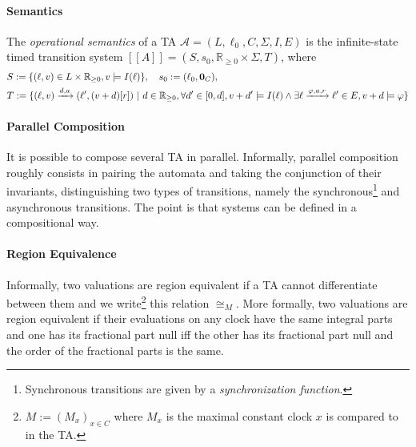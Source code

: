 \documentclass[11pt]{article}
\theoremstyle{definition}
\theoremstyle{remark}
\theoremstyle{definition}
\begin{document}
\paragraph{Semantics}\label{par:semantics}
The \emph{operational semantics} of a TA $\mathcal{A} = (L, \ell_0, C, \Sigma, I, E)$ is the infinite-state timed transition system $[\![A]\!] = (S, s_0, \mathbb{R}_{\geq 0} \times \Sigma, T)$, where
\begin{align*}
	&S := \{(\ell, v) \in L \times \mathbb{R}_{\geq 0}, v \models I(\ell)\}, \quad s_0 := (\ell_0, \text{\bf 0}_C),\\
	&T := \{(\ell, v) \xrightarrow{d, a} (\ell', (v+d)[r]) \ | \ d \in \mathbb{R}_{\geq 0}, \forall d' \in [0, d], v + d' \models I(\ell) \land \exists \ell \xrightarrow{\varphi, a, r} \ell' \in E, v + d \models \varphi \}
\end{align*}


\paragraph{Parallel Composition}\label{par:ta_parcomp}
It is possible to compose several TA in parallel. Informally, parallel composition roughly consists in pairing the automata and taking the conjunction of their invariants, distinguishing two types of transitions, namely the synchronous\footnote{Synchronous transitions are given by a \emph{synchronization function}.} and asynchronous transitions. The point is that systems can be defined in a compositional way.

\paragraph{Region Equivalence}\label{par:ta_regeq}
Informally, two valuations are region equivalent if a TA cannot differentiate between them and we write\footnote{$M := (M_x)_{x \in C}$ where $M_x$ is the maximal constant clock $x$ is compared to in the TA.} this relation $\cong_M$.
More formally, two valuations are region equivalent if their evaluations on any clock have the same integral parts and one has its fractional part null iff the other has its fractional part null and the order of the fractional parts is the same.
\end{document}
